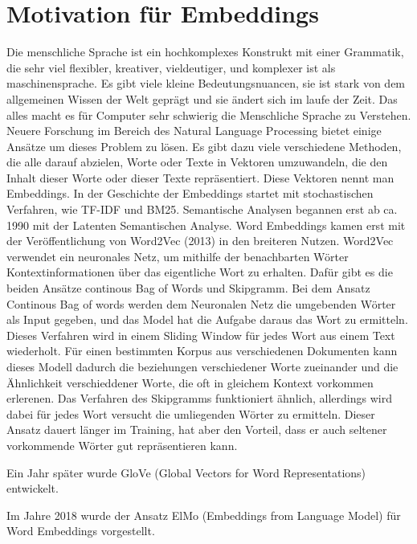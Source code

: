 \section{Motivation für Embeddings}

Die menschliche Sprache ist ein hochkomplexes Konstrukt mit einer Grammatik, die sehr viel flexibler, kreativer, vieldeutiger, und komplexer ist als maschinensprache. 
Es gibt viele kleine Bedeutungsnuancen, sie ist stark von dem allgemeinen Wissen der Welt geprägt und sie ändert sich im laufe der Zeit. 
Das alles macht es für Computer sehr schwierig die Menschliche Sprache zu Verstehen. 
Neuere Forschung im Bereich des Natural Language Processing bietet einige Ansätze um dieses Problem zu lösen. 
Es gibt dazu viele verschiedene Methoden, die alle darauf abzielen, Worte oder Texte in Vektoren umzuwandeln, die den Inhalt dieser Worte oder dieser Texte repräsentiert.
Diese Vektoren nennt man Embeddings.
In der Geschichte der Embeddings startet mit stochastischen Verfahren, wie TF-IDF und BM25. 
Semantische Analysen begannen erst ab ca. 1990 mit der Latenten Semantischen Analyse.
Word Embeddings kamen erst mit der Veröffentlichung von Word2Vec (2013) in den breiteren Nutzen. 
Word2Vec verwendet ein neuronales Netz, um mithilfe der benachbarten Wörter Kontextinformationen über das eigentliche Wort zu erhalten. 
Dafür gibt es die beiden Ansätze continous Bag of Words und Skipgramm.
Bei dem Ansatz Continous Bag of words werden dem Neuronalen Netz die umgebenden Wörter als Input gegeben, und das Model hat die Aufgabe daraus das Wort zu ermitteln. 
Dieses Verfahren wird in einem Sliding Window für jedes Wort aus einem Text wiederholt. 
Für einen bestimmten Korpus aus verschiedenen Dokumenten kann dieses Modell dadurch die beziehungen verschiedener Worte zueinander und die Ähnlichkeit verschieddener Worte, die oft in gleichem Kontext vorkommen erlerenen. 
Das Verfahren des Skipgramms funktioniert ähnlich, allerdings wird dabei für jedes Wort versucht die umliegenden Wörter zu ermitteln. 
Dieser Ansatz dauert länger im Training, hat aber den Vorteil, dass er auch seltener vorkommende Wörter gut repräsentieren kann.

Ein Jahr später wurde GloVe (Global Vectors for Word Representations) entwickelt. 

Im Jahre 2018 wurde der Ansatz ElMo (Embeddings from Language Model) für Word Embeddings vorgestellt.











